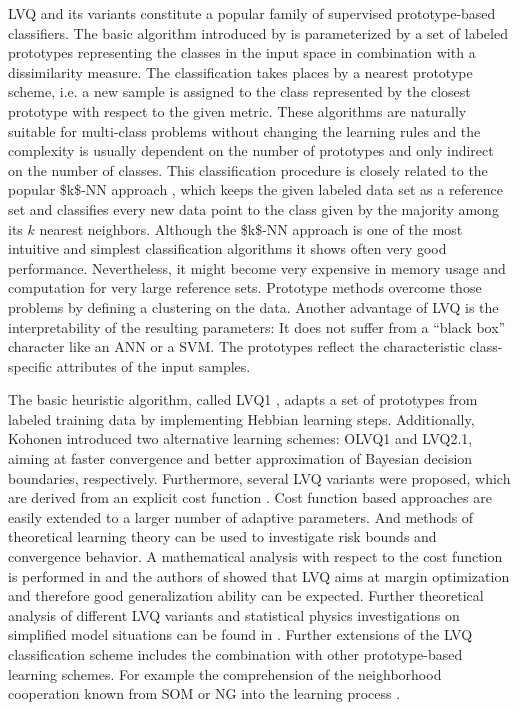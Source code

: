 \ac{LVQ} and its variants constitute a popular family of supervised prototype-based classifiers. 
The basic algorithm introduced by \cite{Kohonen1986} is parameterized by a set of labeled prototypes 
representing the classes in the input space in combination with a dissimilarity measure. 
The classification takes places by a nearest prototype scheme, i.e. a new sample is assigned to the 
class represented by the closest prototype with respect to the given metric. 
These algorithms are naturally suitable for multi-class problems without changing the learning rules and the complexity is usually 
dependent on the number of prototypes and only indirect on the number of classes. 
This classification procedure is closely related to the popular \ac{$k$-NN} approach \cite{Cover1967}, 
which keeps the given labeled data set as a reference set and classifies every new data point to the class 
given by the majority among its $k$ nearest neighbors. 
Although the \ac{$k$-NN}
 approach is one of the most intuitive and simplest classification algorithms it shows often very good performance. 
Nevertheless, it might become very expensive in memory usage and computation for very large reference sets. 
Prototype methods overcome those problems by defining a clustering on the data. 
Another advantage of \ac{LVQ} is the interpretability of the resulting parameters: 
It does not suffer from a ``black box'' character like an \ac{ANN} or a \ac{SVM}. 
The prototypes reflect the characteristic class-specific attributes of the input samples. 

The basic heuristic algorithm, called LVQ1 \cite{Kohonen1986}, adapts a set of prototypes from labeled training 
data by implementing Hebbian learning steps. 
Additionally, Kohonen introduced two alternative learning schemes: \ac{OLVQ1} and LVQ2.1, aiming at faster convergence and better 
approximation of Bayesian decision boundaries, respectively. 
Furthermore, several \ac{LVQ} variants were proposed, which are derived from an explicit cost function
\cite{Sato1996,Seo2002,Seo2003}. 
Cost function based approaches are easily extended to a larger number of adaptive parameters. 
And methods of theoretical learning theory can be used to investigate risk bounds and convergence behavior. 
A mathematical analysis with respect to the cost function is performed in \cite{Sato1998} and the authors of \cite{Crammer2002} 
showed that \ac{LVQ} aims at margin optimization and therefore good generalization ability can be expected. 
Further theoretical analysis of different \ac{LVQ} variants and statistical physics investigations on simplified model situations 
can be found in \cite{Gosh2006,Biehl2007}.
Further extensions of the \ac{LVQ} classification scheme includes the combination with other prototype-based learning schemes. 
For example the comprehension of the neighborhood cooperation known from \ac{SOM} or \ac{NG} into the learning process 
\cite{Kohonen2002,Hammer2005}. 

